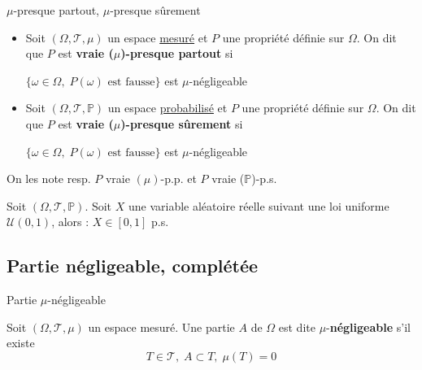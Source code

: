 \begin{Definition}[colbacktitle=red!75!black]{$\mu$-presque partout, $\mu$-presque sûrement}{}
\begin{itemize}

  \item Soit $(\Omega, \mathcal{T}, \mu)$ un espace \underline{mesuré} et $P$ une propriété définie sur $\Omega$. On dit que $P$ est \textbf{vraie ($\mu$)-presque partout} si 
    \begin{center}
      $\{\omega \in \Omega, \; P(\omega) \text{ est fausse}\}$ est $\mu$-négligeable
    \end{center}
  \item Soit $(\Omega, \mathcal{T}, \mathbb{P})$ un espace \underline{probabilisé} et $P$ une propriété définie sur $\Omega$. On dit que $P$ est \textbf{vraie ($\mu$)-presque sûrement} si 
    \begin{center}
      $\{\omega \in \Omega, \; P(\omega) \text{ est fausse}\}$ est $\mu$-négligeable
    \end{center}

\end{itemize}

On les note resp. $P$ vraie $(\mu)$-p.p. et $P$ vraie ($\mathbb{P}$)-p.s.
\end{Definition}

\begin{Example}{}{}
Soit $(\Omega, \mathcal{T}, \mathbb{P})$. Soit $X$ une variable aléatoire réelle suivant une loi uniforme $\mathcal{U}(0,1)$, alors : $X \in [0,1]$ p.s.
\end{Example}

\subsection{Partie négligeable, complétée} %
\label{sub:}

\begin{Definition}[colbacktitle=red!75!black]{Partie $\mu$-négligeable}{}

  Soit $(\Omega, \mathcal{T}, \mu)$ un espace mesuré. Une partie $A$ de $\Omega$ est dite $\mu$-\textbf{négligeable} s'il existe 
  \begin{equation}
    T \in \mathcal{T}, \; A \subset T, \; \mu(T) = 0
  \end{equation}
\end{Definition}


